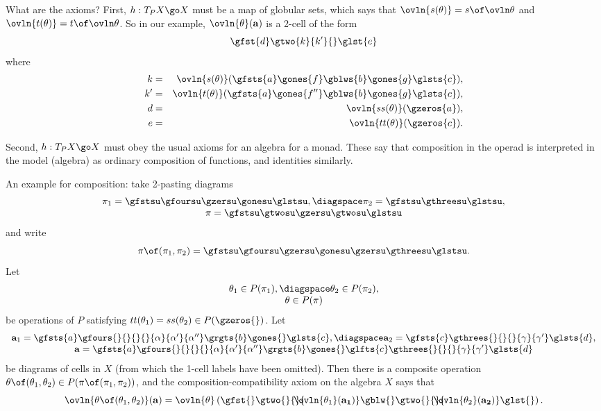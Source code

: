 What are the axioms?  First, $h: T_P X \go X$ must be a map of globular
sets, which says that $\ovln{s(\theta)} = s \of \ovln\theta$ and
$\ovln{t(\theta)} = t \of \ovln\theta$.  So in our example,
$\ovln{\theta}(\mathbf{a})$ is a 2-cell of the form
\[
\gfst{d}\gtwo{k}{k'}{}\glst{e}
\]
where 
% 
\begin{eqnarray*}
k	&= 	
	&\ovln{s(\theta)}(\gfsts{a}\gones{f}\gblws{b}\gones{g}\glsts{c}),\\
k'	&= 	
	&\ovln{t(\theta)}(\gfsts{a}\gones{f''}\gblws{b}\gones{g}\glsts{c}),\\
d	&=	&\ovln{ss(\theta)}(\gzeros{a}),			\\
e	&=	&\ovln{tt(\theta)}(\gzeros{c}).
\end{eqnarray*}

Second, $h: T_P X \go X$ must obey the usual axioms for an algebra for a
monad.  These say that composition in the operad is interpreted in the
model (algebra) as ordinary composition of functions, and identities
similarly.

An example for composition:%
%
%
take 2-pasting diagrams
\[
\begin{array}{c}
\pi_1 = \gfstsu\gfoursu\gzersu\gonesu\glstsu,
\diagspace
\pi_2 = \gfstsu\gthreesu\glstsu,		\\
\pi = \gfstsu\gtwosu\gzersu\gtwosu\glstsu
\end{array}
\]
and write
\[
\pi \of (\pi_1, \pi_2) = 
\gfstsu\gfoursu\gzersu\gonesu\gzersu\gthreesu\glstsu.
\]
Let
\[
\begin{array}{c}
\theta_1 \in P(\pi_1), 
\diagspace
\theta_2 \in P(\pi_2),				\\
\theta \in P(\pi)
\end{array}
\]
be operations of $P$ satisfying $tt(\theta_1) = ss(\theta_2) \in
P(\gzeros{})$.  Let
\[
\begin{array}{c}
\mathbf{a}_1 = 
\gfsts{a}
\gfours{}{}{}{}{\alpha}{\alpha'}{\alpha''}
\grgts{b}
\gones{}
\glsts{c},
\diagspace
\mathbf{a}_2 = 
\gfsts{c}
\gthrees{}{}{}{\gamma}{\gamma'}
\glsts{d},					\\
\mathbf{a} = 
\gfsts{a}
\gfours{}{}{}{}{\alpha}{\alpha'}{\alpha''}
\grgts{b}
\gones{}
\glfts{c}
\gthrees{}{}{}{\gamma}{\gamma'}
\glsts{d}
\end{array}
\]
be diagrams of cells in $X$ (from which the 1-cell labels have been
omitted).  Then there is a composite operation $\theta \of (\theta_1,
\theta_2) \in P(\pi \of (\pi_1, \pi_2))$, and the composition-compatibility
axiom on the algebra $X$ says that
\[
\ovln{\theta \of (\theta_1, \theta_2)} (\mathbf{a}) 
=
\ovln{\theta} 
\left(
\gfst{}
\gtwo{}{}{\!\!\!\!\!\!\!\ovln{\theta_1}(\mathbf{a_1})}
\gblw{}
\gtwo{}{}{\!\!\!\!\!\!\!\ovln{\theta_2}(\mathbf{a_2})}
\glst{}
\right).
\]

